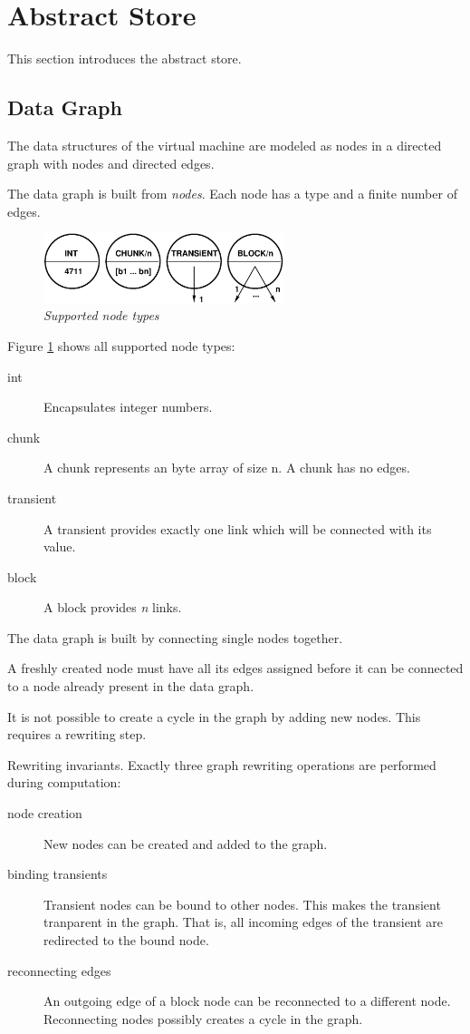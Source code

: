 \section{Abstract Store}
This section introduces the abstract store.
\subsection{Data Graph}
\label{graph_model}
The data structures of the virtual machine are modeled as nodes in a
directed graph with nodes and directed edges.

The data graph is built from {\em nodes}.
Each node has a type and a finite number of edges.

\begin{figure}[ht]
\centering
\includegraphics[width=7.0cm]{figures/graph_nodes}
\caption{\label{store_units} {\it Supported node types}}
\end{figure}

Figure \ref{store_units} shows all supported node types:
\begin{description}
\item[int]
Encapsulates integer numbers.
\item[chunk]
A chunk represents an byte array of size n. A chunk has no edges.
\item[transient]
A transient provides exactly one link which will be connected
with its value.
\item[block]
A block provides {\em n} links.
\end{description}
The data graph is built by connecting single nodes together.

A freshly created node must
have all its edges assigned before it can be connected
to a node already present in the data graph.

It is not possible to create a cycle in the graph by adding new nodes.
This requires a rewriting step.
\begin{paragraph}{Rewriting invariants.}
Exactly three graph rewriting operations are performed during computation:
\begin{description}
\item[node creation] New nodes can be created and added to the graph.
\item[binding transients] Transient nodes can be bound to other nodes.
This makes the transient tranparent in the graph. That is,
all incoming edges of the transient are redirected to the bound node.
\item[reconnecting edges] An outgoing edge of a block node can be
reconnected to a different node.
Reconnecting nodes possibly creates a cycle in the graph.
\end{description}
\end{paragraph}
